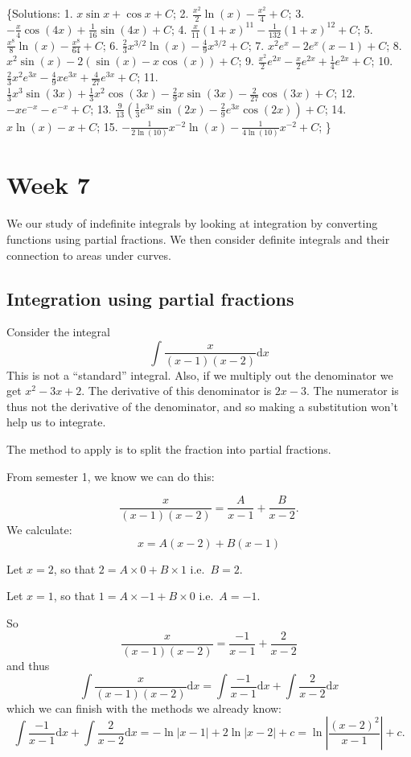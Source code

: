 \documentclass[
  11pt,
  oneside]{book}
\newcommand{\slide}{}
\theoremstyle{definition}
\theoremstyle{definition}
\theoremstyle{definition}
\theoremstyle{definition}
\theoremstyle{remark}
\begin{document}
\{Solutions:
1. \(x\sin x+\cos x + C\);
2. \(\frac{x^2}{2}\ln(x) - \frac{x^2}{4}+C\);
3. \(-\frac{x}{4}\cos(4x)+\frac{1}{16}\sin(4x)+C\);
4. \(\frac{x}{11}(1+x)^{11} - \frac{1}{132}(1+x)^{12}+C\);
5. \(\frac{x^8}{8}\ln(x) - \frac{x^8}{64}+C\);
6. \(\frac{2}{3}x^{3/2}\ln(x) - \frac{4}{9}x^{3/2}+C\);
7. \(x^2e^x - 2e^x(x-1)+C\);
8. \(x^2\sin(x) - 2(\sin(x)-x\cos(x))+C\);
9. \(\frac{x^2}{2}e^{2x}-\frac{x}{2}e^{2x}+\frac{1}{4}e^{2x}+C\);
10. \(\frac{2}{3}x^2e^{3x}-\frac{4}{9}xe^{3x}+\frac{4}{27}e^{3x}+C\);
11. \(\frac{1}{3}x^3\sin(3x)+\frac{1}{3}x^2\cos(3x)-\frac{2}{9}x\sin(3x)-\frac{2}{27}\cos(3x)+C\);
12. \(-xe^{-x}-e^{-x}+C\);
13. \(\frac{9}{13}\left( \frac{1}{3}e^{3x}\sin(2x)-\frac{2}{9}e^{3x}\cos(2x) \right)+C\);
14. \(x\ln(x) - x +C\);
15. \(-\frac{1}{2\ln(10)}x^{-2}\ln(x) - \frac{1}{4\ln(10)}x^{-2} + C\);
\}

\chapter{Week 7}\label{week-seven}

We our study of indefinite integrals by looking at integration by converting functions using partial fractions. We then consider definite integrals and their connection to areas under curves.
\slide

\section{Integration using partial fractions}\label{integration-using-partial-fractions}

Consider the integral
\[
\int\frac{x}{(x-1)(x-2)}\mathrm{d}x
\]
This is not a ``standard'' integral. Also, if we multiply out the denominator we get \(x^2 - 3x + 2\). The derivative of this denominator is \(2x - 3\). The numerator is thus not the derivative of the denominator, and so making a substitution won't help us to integrate.

The method to apply is to split the fraction into partial fractions.

From semester 1, we know we can do this:

\begin{notslides}

\[
\frac{x}{(x-1)(x-2)} = \frac A{x-1}+\frac B{x-2}.
\]
We calculate:
\[
x = A(x-2)+B(x-1)
\]

Let \(x=2\), so that \(2=A\times0+B\times1\) i.e.~\(B=2\).

Let \(x=1\), so that \(1=A\times-1+B\times0\) i.e.~\(A=-1\).

So
\[
\frac{x}{(x-1)(x-2)} = \frac {-1}{x-1}+\frac 2{x-2}
\]
and thus
\[
\int\frac{x}{(x-1)(x-2)}\mathrm{d}x = \int\frac {-1}{x-1}\mathrm{d}x+\int\frac 2{x-2}\mathrm{d}x
\]
which we can finish with the methods we already know:
\[
\int\frac {-1}{x-1}\mathrm{d}x+\int\frac 2{x-2}\mathrm{d}x = -\ln|x-1|+2\ln|x-2|+c = \ln\left|\frac{(x-2)^2}{x-1}\right|+c.
\]

\end{notslides}
\end{document}
